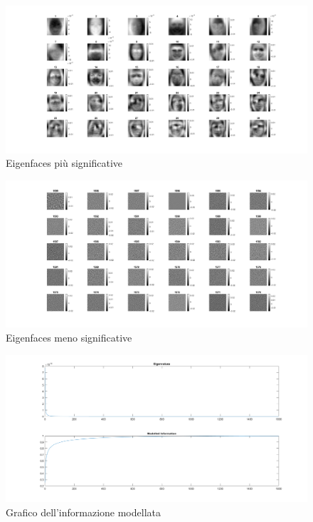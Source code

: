 \documentclass[12pt]{article}
\begin{document}
\begin{figure}[htp]
	\centering
	\caption{Eigenfaces più significative}
	\label{fig1}
	\includegraphics[width=\textwidth, height=\textheight, keepaspectratio]{eigenfaces1.png}
\end{figure}
\begin{figure}[htp]
	\centering
    \caption{Eigenfaces meno significative}
	\includegraphics[width=\textwidth, height=\textheight, keepaspectratio]{eigenfaces2.png}
\end{figure}
\begin{figure}[htp]
	\centering
    \caption{Grafico dell'informazione modellata}
	\includegraphics[width=\textwidth, height=\textheight, keepaspectratio]{informazione.png}
\end{figure}
\end{document}
